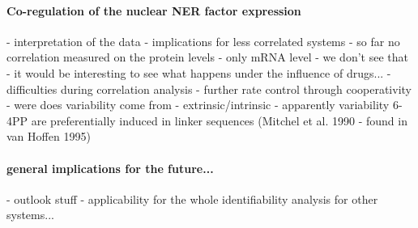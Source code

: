 \paragraph{Co-regulation of the nuclear NER factor expression}
- interpretation of the data
- implications for less correlated systems
- so far no correlation measured on the protein levels 
- only mRNA level - we don't see that
- it would be interesting to see what happens under the influence of drugs...
- difficulties during correlation analysis
- further rate control through cooperativity 
- were does variability come from - extrinsic/intrinsic
- apparently variability 6-4PP are preferentially induced in linker sequences (Mitchel et al. 1990 - found in van Hoffen 1995)

\paragraph{general implications for the future...}
- outlook stuff 
- applicability for the whole identifiability analysis for other systems...
